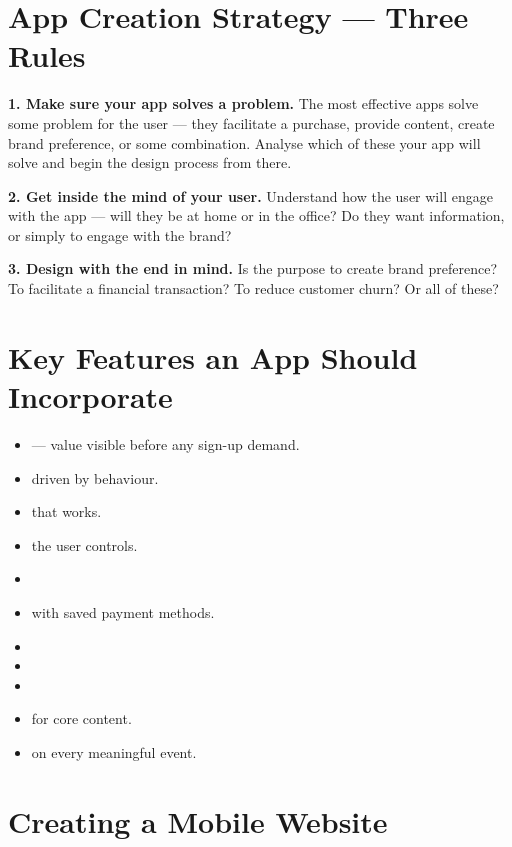 \section{App Creation Strategy --- Three Rules}

\begin{frameworkbox}
\textbf{1. Make sure your app solves a problem.} The most effective apps solve
some problem for the user --- they facilitate a purchase, provide content, create
brand preference, or some combination. Analyse which of these your app will solve
and begin the design process from there.

\textbf{2. Get inside the mind of your user.} Understand how the user will engage
with the app --- will they be at home or in the office? Do they want information,
or simply to engage with the brand?

\textbf{3. Design with the end in mind.} Is the purpose to create brand
preference? To facilitate a financial transaction? To reduce customer churn? Or
all of these?
\end{frameworkbox}

\section{Key Features an App Should Incorporate}

\begin{itemize}
\item {} --- value visible before any sign-up demand.
\item {} driven by behaviour.
\item {} that works.
\item {} the user controls.
\item {}
\item {} with saved payment methods.
\item {}
\item {}
\item {}
\item {} for core content.
\item {} on every meaningful event.
\end{itemize}

\section{Creating a Mobile Website}

